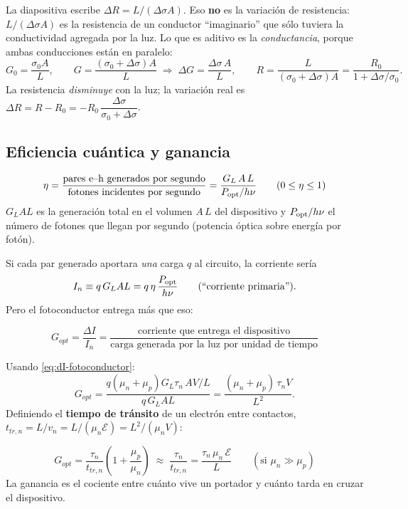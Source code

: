 \begin{ojo}
La diapositiva escribe $\Delta R = L/(\Delta\sigma A)$. Eso \textbf{no} es la variación de
resistencia: $L/(\Delta\sigma A)$ es la resistencia de un conductor ``imaginario'' que sólo
tuviera la conductividad agregada por la luz. Lo que es aditivo es la
\emph{conductancia}, porque ambas conducciones están en paralelo:
\[
  G_0=\frac{\sigma_0 A}{L},\qquad G=\frac{(\sigma_0+\Delta\sigma)A}{L}
  \;\Rightarrow\; \Delta G = \frac{\Delta\sigma\,A}{L},
  \qquad
  R=\frac{L}{(\sigma_0+\Delta\sigma)A}=\frac{R_0}{1+\Delta\sigma/\sigma_0}.
\]
La resistencia \emph{disminuye} con la luz; la variación real es
$\Delta R = R-R_0 = -R_0\,\dfrac{\Delta\sigma}{\sigma_0+\Delta\sigma}$.
\end{ojo}

\subsection{Eficiencia cuántica y ganancia}

\begin{definicion}
\[
  \eta = \frac{\text{pares e--h generados por segundo}}{\text{fotones incidentes por segundo}}
  = \frac{G_L\,A\,L}{P_{\mathrm{opt}}/h\nu}
  \qquad (0\le\eta\le 1)
\]
$G_L A L$ es la generación total en el volumen $A\,L$ del dispositivo y $P_{\mathrm{opt}}/h\nu$ el
número de fotones que llegan por segundo (potencia óptica sobre energía por fotón).
\end{definicion}

Si cada par generado aportara \emph{una} carga $q$ al circuito, la corriente sería
\[
  I_n \equiv q\,G_L A L = q\,\eta\,\frac{P_{\mathrm{opt}}}{h\nu}
  \qquad\text{(``corriente primaria'')}.
\]
Pero el fotoconductor entrega más que eso:

\begin{definicion}
\[
  G_{opt} = \frac{\Delta I}{I_n}
  = \frac{\text{corriente que entrega el dispositivo}}{\text{carga generada por la luz por unidad de tiempo}}
\]
\end{definicion}

Usando \eqref{eq:dI-fotoconductor}:
\[
  G_{opt} = \frac{q(\mu_n+\mu_p)G_L\tau_n\,AV/L}{q\,G_L A L}
  = \frac{(\mu_n+\mu_p)\,\tau_n V}{L^2}.
\]
Definiendo el \textbf{tiempo de tránsito} de un electrón entre contactos,
$t_{tr,n} = L/v_n = L/(\mu_n\mathcal{E}) = L^2/(\mu_n V)$:

\begin{clave}
\[
  G_{opt} = \frac{\tau_n}{t_{tr,n}}\left(1+\frac{\mu_p}{\mu_n}\right)
  \;\approx\; \frac{\tau_n}{t_{tr,n}} = \frac{\tau_n\,\mu_n\,\mathcal{E}}{L}
  \qquad(\text{si }\mu_n\gg\mu_p)
\]
La ganancia es el cociente entre cuánto vive un portador y cuánto tarda en cruzar el
dispositivo.
\end{clave}

